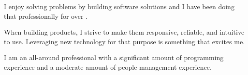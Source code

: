 

\begin{cvparagraph}
I enjoy solving problems by building software solutions and I have been doing that professionally for over . 

When building products, I strive to make them responsive, reliable, and intuitive to use. Leveraging new technology for that purpose is something that excites me.

I am an all-around professional with a significant amount of programming experience and a moderate amount of people-management experience.
\end{cvparagraph}
